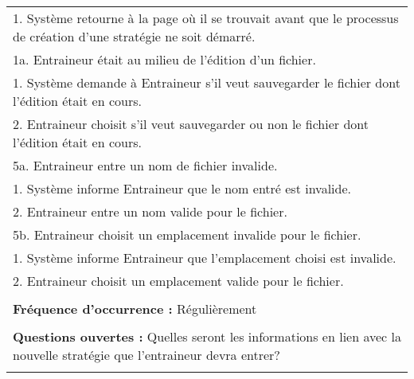 \begin{longtable}{|p{16cm}|}
	\hspace{1cm}1. Système retourne à la page où il se trouvait avant que le processus de création d'une stratégie ne soit démarré.\\
	1a. Entraineur était au milieu de l'édition d'un fichier.\\
	\hspace{1cm}1. Système demande à Entraineur s'il veut sauvegarder le fichier dont l'édition était en cours.\\
	\hspace{1cm}2. Entraineur choisit s'il veut sauvegarder ou non le fichier dont l'édition était en cours.\\
	5a. Entraineur entre un nom de fichier invalide.\\
	\hspace{1cm}1. Système informe Entraineur que le nom entré est invalide.\\
	\hspace{1cm}2. Entraineur entre un nom valide pour le fichier.\\
	5b. Entraineur choisit un emplacement invalide pour le fichier.\\
	\hspace{1cm}1. Système informe Entraineur que l'emplacement choisi est invalide.\\
	\hspace{1cm}2. Entraineur choisit un emplacement valide pour le fichier.\\
	\\
	\textbf{Fréquence d'occurrence :} Régulièrement\\
	\\
	\textbf{Questions ouvertes :} Quelles seront les informations en lien avec la nouvelle stratégie que l'entraineur devra entrer?\\
	\\
	\hline
\end{longtable}

